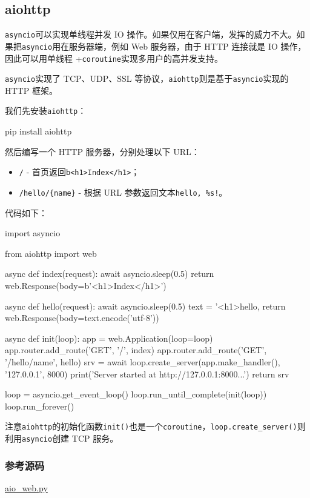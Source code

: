 \hypertarget{aiohttp}{%
\subsection{aiohttp}\label{aiohttp}}

\texttt{asyncio}可以实现单线程并发 IO
操作。如果仅用在客户端，发挥的威力不大。如果把\texttt{asyncio}用在服务器端，例如
Web 服务器，由于 HTTP 连接就是 IO 操作，因此可以用单线程
+\texttt{coroutine}实现多用户的高并发支持。

\texttt{asyncio}实现了 TCP、UDP、SSL
等协议，\texttt{aiohttp}则是基于\texttt{asyncio}实现的 HTTP 框架。

我们先安装\texttt{aiohttp}：

\begin{pythoncode}
pip install aiohttp
\end{pythoncode}

然后编写一个 HTTP 服务器，分别处理以下 URL：

\begin{itemize}
\item
  \texttt{/} -
  首页返回\texttt{b\textquotesingle{}\textless{}h1\textgreater{}Index\textless{}/h1\textgreater{}\textquotesingle{}}；
\item
  \texttt{/hello/\{name\}} - 根据 URL
  参数返回文本\texttt{hello,\ \%s!}。
\end{itemize}

代码如下：

\begin{pythoncode}
import asyncio

from aiohttp import web

async def index(request):
    await asyncio.sleep(0.5)
    return web.Response(body=b'<h1>Index</h1>')

async def hello(request):
    await asyncio.sleep(0.5)
    text = '<h1>hello, %
    return web.Response(body=text.encode('utf-8'))

async def init(loop):
    app = web.Application(loop=loop)
    app.router.add_route('GET', '/', index)
    app.router.add_route('GET', '/hello/{name}', hello)
    srv = await loop.create_server(app.make_handler(), '127.0.0.1', 8000)
    print('Server started at http://127.0.0.1:8000...')
    return srv

loop = asyncio.get_event_loop()
loop.run_until_complete(init(loop))
loop.run_forever()
\end{pythoncode}

注意\texttt{aiohttp}的初始化函数\texttt{init()}也是一个\texttt{coroutine}，\texttt{loop.create\_server()}则利用\texttt{asyncio}创建
TCP 服务。

\hypertarget{ux53c2ux8003ux6e90ux7801}{%
\subsubsection{参考源码}\label{ux53c2ux8003ux6e90ux7801}}

\href{https://github.com/michaelliao/learn-python3/blob/master/samples/async/aio_web.py}{aio\_web.py}

